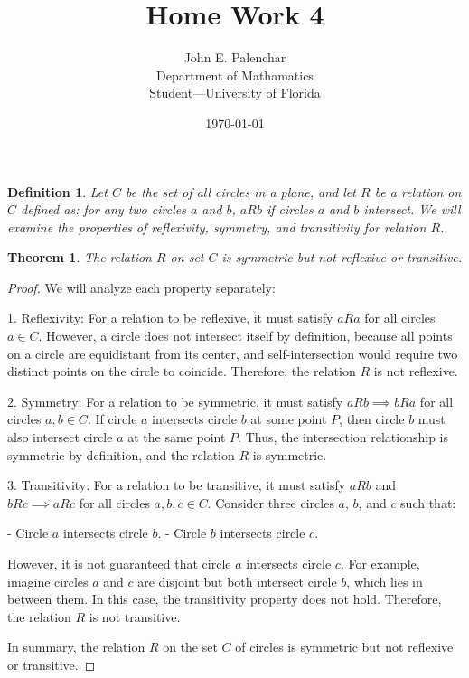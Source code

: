 \documentclass{article}
\title{Home Work 4}
\author{
        John E. Palenchar \\
                Department of Mathamatics\\
        Student---University of Florida\\
}
\date{\today}
\newtheorem{theorem}{Theorem}
\newtheorem{definition}{Definition}
\begin{document}
\maketitle

\begin{definition}
Let $C$ be the set of all circles in a plane, and let $R$ be a relation on $C$ defined as: for any two circles $a$ and $b$, $aRb$ if circles $a$ and $b$ intersect. We will examine the properties of reflexivity, symmetry, and transitivity for relation $R$.
\end{definition}

\begin{theorem}
The relation $R$ on set $C$ is symmetric but not reflexive or transitive.
\end{theorem}

\begin{proof}
We will analyze each property separately:

1. Reflexivity: For a relation to be reflexive, it must satisfy $aRa$ for all circles $a \in C$. However, a circle does not intersect itself by definition, because all points on a circle are equidistant from its center, and self-intersection would require two distinct points on the circle to coincide. Therefore, the relation $R$ is not reflexive.

2. Symmetry: For a relation to be symmetric, it must satisfy $aRb \implies bRa$ for all circles $a, b \in C$. If circle $a$ intersects circle $b$ at some point $P$, then circle $b$ must also intersect circle $a$ at the same point $P$. Thus, the intersection relationship is symmetric by definition, and the relation $R$ is symmetric.

3. Transitivity: For a relation to be transitive, it must satisfy $aRb$ and $bRc \implies aRc$ for all circles $a, b, c \in C$. Consider three circles $a$, $b$, and $c$ such that:

    - Circle $a$ intersects circle $b$.
    - Circle $b$ intersects circle $c$.

However, it is not guaranteed that circle $a$ intersects circle $c$. For example, imagine circles $a$ and $c$ are disjoint but both intersect circle $b$, which lies in between them. In this case, the transitivity property does not hold. Therefore, the relation $R$ is not transitive.

In summary, the relation $R$ on the set $C$ of circles is symmetric but not reflexive or transitive.
\end{proof}
\end{document}
